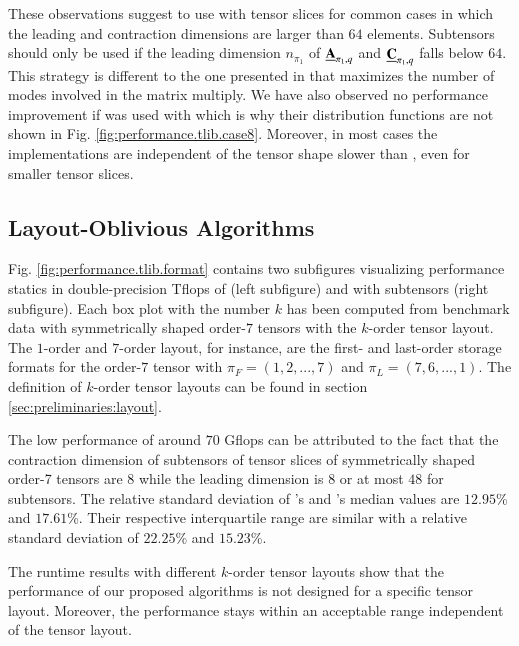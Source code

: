 These observations suggest to use  with tensor slices for common cases in which the leading and contraction dimensions are larger than $64$ elements.
Subtensors should only be used if the leading dimension $n_{\pi_1}$ of $\underline{\mathbf{A}}_{\pi_1,q}$ and $\underline{\mathbf{C}}_{\pi_1,q}$ falls below $64$.
This strategy is different to the one presented in \cite{li:2015:input} that maximizes the number of modes involved in the matrix multiply.
We have also observed no performance improvement if  was used with  which is why their distribution functions are not shown in Fig. \ref{fig:performance.tlib.case8}.
Moreover, in most cases the  implementations are independent of the tensor shape slower than , even for smaller tensor slices.
\vspace{-1em}

\subsection{Layout-Oblivious Algorithms}
Fig. \ref{fig:performance.tlib.format} contains two subfigures visualizing performance statics in double-precision Tflops of  (left subfigure) and  with subtensors (right subfigure).
Each box plot with the number $k$ has been computed from benchmark data with symmetrically shaped order-$7$ tensors with the $k$-order tensor layout.
The $1$-order and $7$-order layout, for instance, are the first- and last-order storage formats for the order-$7$ tensor with $\pi_F=(1,2,...,7)$ and $\pi_L= (7,6,...,1)$.
The definition of $k$-order tensor layouts can be found in section \ref{sec:preliminaries:layout}.

The low performance of around $70$ Gflops can be attributed to the fact that the contraction dimension of subtensors of tensor slices of symmetrically shaped order-7 tensors are $8$ while the leading dimension is $8$ or at most $48$ for subtensors.
The relative standard deviation of 's and 's median values are $12.95$\% and $17.61$\%.
Their respective interquartile range are similar with a relative standard deviation of $22.25$\% and $15.23$\%.

The runtime results with different $k$-order tensor layouts show that the performance of our proposed algorithms is not designed for a specific tensor layout.
Moreover, the performance stays within an acceptable range independent of the tensor layout.
\vspace{-1em}

